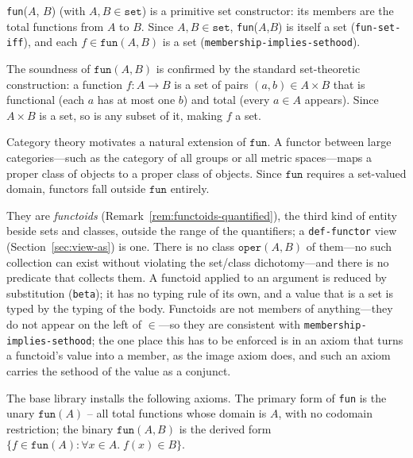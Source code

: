 \texttt{fun}($A$, $B$) (with $A, B \in \mathtt{set}$) is a primitive set constructor: its members are
the total functions from $A$ to $B$.  Since $A, B \in \mathtt{set}$,
\texttt{fun}($A$,$B$) is itself a set (\texttt{fun-set-iff}), and each
$f \in \mathtt{fun}(A,B)$ is a set (\texttt{membership-implies-sethood}).

\begin{remark}
The soundness of $\mathtt{fun}(A,B)$ is confirmed by the standard
set-theoretic construction: a function $f : A \to B$ is a set of pairs
$(a, b) \in A \times B$ that is functional (each $a$ has at most one $b$)
and total (every $a \in A$ appears).  Since $A \times B$ is a set, so
is any subset of it, making $f$ a set.
\end{remark}


\begin{remark}
Category theory motivates a natural extension of $\mathtt{fun}$.  A
functor between large categories---such as the category of all groups or
all metric spaces---maps a proper class of objects to a proper class of
objects.  Since $\mathtt{fun}$ requires a set-valued domain, functors
fall outside $\mathtt{fun}$ entirely.

They are \emph{functoids} (Remark~\ref{rem:functoids-quantified}), the
third kind of entity beside sets and classes, outside the range of the
quantifiers; a \texttt{def-functor} view (Section~\ref{sec:view-as}) is
one.  There is no class $\mathtt{oper}(A,B)$ of them---no such collection
can exist without violating the set/class dichotomy---and there is no
predicate that collects them.  A functoid applied to an argument is reduced by
substitution (\texttt{beta}); it has no typing rule of its own, and a
value that is a set is typed by the typing of the body.  Functoids are
not members of anything---they do not appear on the left of $\in$---so
they are consistent with \texttt{membership-implies-sethood}; the one
place this has to be enforced is in an axiom that turns a functoid's
value into a member, as the image axiom does, and such an axiom carries
the sethood of the value as a conjunct.
\end{remark}

%
The base library installs the following axioms.  The primary form of
\texttt{fun} is the unary $\mathtt{fun}(A)$ -- all total functions whose
domain is $A$, with no codomain restriction; the binary $\mathtt{fun}(A,B)$
is the derived form $\{f \in \mathtt{fun}(A) : \forall x \in A.\;f(x) \in B\}$.


